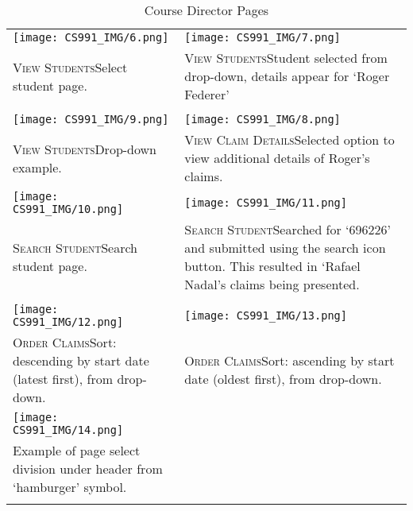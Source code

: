 \documentclass[11pt, english]{article}
\begin{document}
	\begin{center}
                \scriptsize
        \begin{longtable}{p{7cm}p{7cm}}
		\texttt{[image: CS991\_IMG/6.png]} & \texttt{[image: CS991\_IMG/7.png]}\\
		\textsc{View Students}\newline Select student page. & \textsc{View Students}\newline Student selected from drop-down, details appear for `Roger Federer'\\
		& \\
		\texttt{[image: CS991\_IMG/9.png]} & \texttt{[image: CS991\_IMG/8.png]}\\
		  \textsc{View Students}\newline Drop-down example. & \textsc{View Claim Details}\newline Selected option to view additional details of Roger's claims.\\
		 \texttt{[image: CS991\_IMG/10.png]} & \texttt{[image: CS991\_IMG/11.png]}\\
		 \textsc{Search Student}\newline Search student page. & \textsc{Search Student}\newline Searched for `696226' and submitted using the search icon button. This resulted in `Rafael Nadal's claims being presented.\\
		 & \\
		\texttt{[image: CS991\_IMG/12.png]} & \texttt{[image: CS991\_IMG/13.png]}\\
		\textsc{Order Claims}\newline Sort: descending by start date (latest first), from drop-down. & \textsc{Order Claims}\newline Sort: ascending by start date (oldest first), from drop-down.\\
		\texttt{[image: CS991\_IMG/14.png]} & \\
		Example of page select division under header from `hamburger' symbol. & \\
                \caption{Course Director Pages}
        \end{longtable}
        \end{center}

\newpage
	
\end{document}
